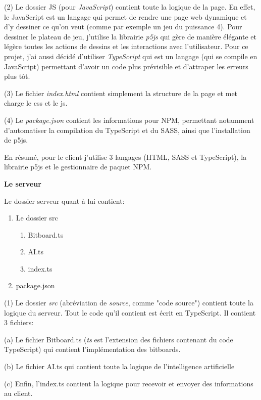 \documentclass[a4paper]{article}
\newcommand{\ptitle}[1]{\vspace{10pt}
{\large \noindent \textbf{#1}}}
\begin{document}
	(2) Le dossier JS (pour \textit{JavaScript}) contient toute la logique de la page. En effet, le JavaScript est un langage qui permet de rendre une page web dynamique et d'y dessiner ce qu'on veut (comme par exemple un jeu du puissance 4). Pour dessiner le plateau de jeu, j'utilise la librairie \textit{p5js} qui gère de manière élégante et légère toutes les actions de dessins et les interactions avec l'utilisateur. Pour ce projet, j'ai aussi décidé d'utiliser \textit{TypeScript} qui est un langage (qui se compile en JavaScript) permettant d'avoir un code plus prévisible et d'attraper les erreurs plus tôt.

	(3) Le fichier \textit{index.html} contient simplement la structure de la page et met charge le css et le js.

	(4) Le \textit{package.json} contient les informations pour NPM, permettant notamment d'automatiser la compilation du TypeScript et du SASS, ainsi que l'installation de p5js.

	En résumé, pour le client j'utilise 3 langages (HTML, SASS et TypeScript), la librairie p5js et le gestionnaire de paquet NPM.

    \ptitle{Le serveur}

	\noindent Le dossier serveur quant à lui contient:
	\begin{enumerate}
		\item Le dossier src
		\begin{enumerate}
            \item Bitboard.ts
            \item AI.ts
            \item index.ts
        \end{enumerate}
		\item package.json
	\end{enumerate}
    \vspace{5pt}

	(1) Le dossier \textit{src} (abréviation de \textit{source}, comme "code source") contient toute la logique du serveur. Tout le code qu'il contient est écrit en TypeScript. Il contient 3 fichiers:
	    
	\indent\indent(a) Le fichier Bitboard.ts (\textit{ts} est l'extension des fichiers contenant du code TypeScript) qui contient l'implémentation des bitboards.

	\indent\indent(b) Le fichier AI.ts qui contient toute la logique de l'intelligence artificielle

	\indent\indent(c) Enfin, l'index.ts contient la logique pour recevoir et envoyer des informations au client.
\end{document}
